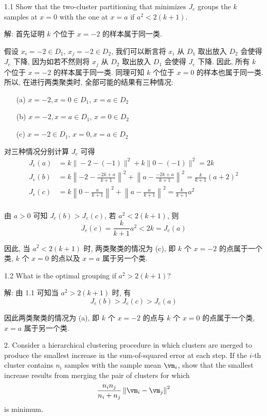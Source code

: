\documentclass[openany]{ctexbook}
\theoremstyle{kaiti}
\theoremstyle{normal}
\begin{document}
1.1 Show that the two-cluster partitioning that minimizes $J_e$ groups the $k$ samples at $x=0$ with the one at $x=a$ if $a^2<2(k+1)$.

解: 首先证明 $k$ 个位于 $x=-2$ 的样本属于同一类. 

假设 $x_i=-2\in D_1$, $x_j=-2\in D_2$, 我们可以断言将 $x_i$ 从 $D_1$ 取出放入 $D_2$ 会使得 $J_e$ 下降, 因为如若不然则将 $x_j$ 从 $D_2$ 取出放入 $D_1$ 会使得 $J_e$ 下降. 因此, 所有 $k$ 个位于 $x=-2$ 的样本属于同一类. 同理可知 $k$ 个位于 $x=0$ 的样本也属于同一类. 所以, 在进行两类聚类时, 全部可能的结果有三种情况:

\begin{itemize}
  \item[(a)] $x=-2,x=0\in D_1$, $x=a\in D_2$
  \item[(b)] $x=-2,x=a\in D_1$, $x=0\in D_2$ 
  \item[(c)] $x=-2\in D_1$, $x=0,x=a\in D_2$
\end{itemize}

对三种情况分别计算 $J_e$ 可得
\begin{equation}
  \begin{aligned}
    J_e(a)&=k\|-2-(-1)\|^2+k\|0-(-1)\|^2=2k\\
    J_e(b)&=k\left\|-2-\frac{-2k+a}{k+1}\right\|^2+\left\|a-\frac{-2k+a}{k+1}\right\|^2=\frac{k}{k+1}(a+2)^2\\
    J_e(c)&=k\left\|0-\frac{a}{k+1}\right\|^2+\left\|a-\frac{a}{k+1}\right\|^2=\frac{k}{k+1}a^2\\
  \end{aligned}
\end{equation}

由 $a>0$ 可知 $J_e(b)>J_e(c)$, 若 $a^2<2(k+1)$, 则
\begin{equation}
  J_e(c)=\frac{k}{k+1}a^2<2k=J_e(a)
\end{equation}

因此, 当 $a^2<2(k+1)$ 时, 两类聚类的情况为 (c), 即 $k$ 个 $x=-2$ 的点属于一个类, $k$ 个 $x=0$ 的点以及 $x=a$ 属于另一个类.

1.2 What is the optimal grouping if $a^2>2(k+1)$?

解: 由 1.1 可知当 $a^2>2(k+1)$ 时, 有
\begin{equation}
  J_e(b)>J_e(c)>J_e(a)
\end{equation} 

因此两类聚类的情况为 (a), 即 $k$ 个 $x=-2$ 的点与 $k$ 个 $x=0$ 的点属于一个类, $x=a$ 属于另一个类.

2. Consider a hierarchical clustering procedure in which clusters are merged to produce the smallest increase in the sum-of-squared error at each step. If the $i$-th cluster contains $n_i$ samples with the sample mean $\vm_i$, show that the smallest increase results from merging the pair of clusters for which
\begin{equation}
  \frac{n_i n_j}{n_i+n_j}\left\|\vm_i-\vm_j\right\|^2
\end{equation}
is minimum.
\end{document}
